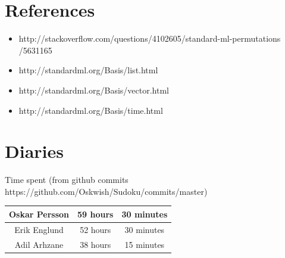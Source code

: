 \documentclass[12pt, a4paper]{article}
\begin{document}
	\section{References}
		\begin{adjustwidth}{3em}{0pt}
			\begin{itemize}
				\item{http://stackoverflow.com/questions/4102605/standard-ml-permutations\\/5631165}
				\item{http://standardml.org/Basis/list.html}
				\item{http://standardml.org/Basis/vector.html}
				\item{http://standardml.org/Basis/time.html}
			\end{itemize}
		\end{adjustwidth}

	\section{Diaries}
		\begin{adjustwidth}{3em}{0pt}
			Time spent (from github commits https://github.com/Oskwish/Sudoku/commits/master)
			
				\begin{table}[h]
					\begin{adjustwidth}{3em}{0pt}
						\begin{center}
							\begin{tabular}{|c|c|c|}
								\hline
								Oskar Persson & 59 hours & 30 minutes \\ \hline
								Erik Englund  & 52 hours & 30 minutes \\ \hline
								Adil Arhzane  & 38 hours & 15 minutes \\ \hline
							\end{tabular}
						\end{center}
					\end{adjustwidth}
				\end{table}
			
		\end{adjustwidth}
\end{document}
